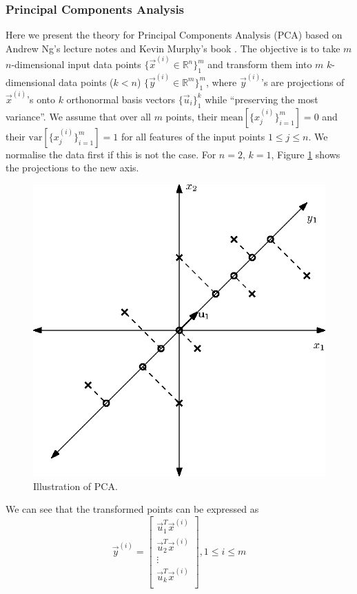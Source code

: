 	\subsubsection{Principal Components Analysis}
		Here we present the theory for Principal Components Analysis (PCA) based on Andrew Ng's lecture notes \cite{ng13} and Kevin Murphy's book \cite{mlBook}. The objective is to take $m$ $n$-dimensional input data points $\{\vec x^{(i)} \in \mathbb{R}^n\}_1^m$ and transform them into $m$ $k$-dimensional data points ($k<n$) $\{\vec y^{(i)} \in \mathbb{R}^m\}_1^m$, where $\vec y^{(i)}$'s are projections of $\vec x^{(i)}$'s onto $k$ orthonormal basis vectors $\{\vec u_i\}_1^k$ while ``preserving the most variance''. We assume that over all $m$ points, their $\text{mean}\left[\{x^{(i)}_j\}_{i = 1}^m\right] = 0$ and their $\text{var}\left[\{x^{(i)}_j\}_{i = 1}^m\right] = 1$ for all features of the input points $1 \leq j \leq n$. We normalise the data first if this is not the case. For $n = 2$, $k = 1$, Figure \ref{fig:pca} shows the projections to the new axis.
		\begin{figure}[h!]
			\centering
				\includegraphics{drawings/pca.eps}
			\caption{Illustration of PCA.}
			\label{fig:pca}
		\end{figure}

		We can see that the transformed points can be expressed as
		\begin{equation}
		 	\vec y^{(i)} =
		 		\begin{bmatrix}
		 			\vec u_1^T \vec x^{(i)} \\
		 			\vec u_2^T \vec x^{(i)} \\
		 			\vdots \\
		 			\vec u_k^T \vec x^{(i)} \\
		 		\end{bmatrix}
		 		, 1 \leq i \leq m
			\label{eqn:pca}
		\end{equation}
		
